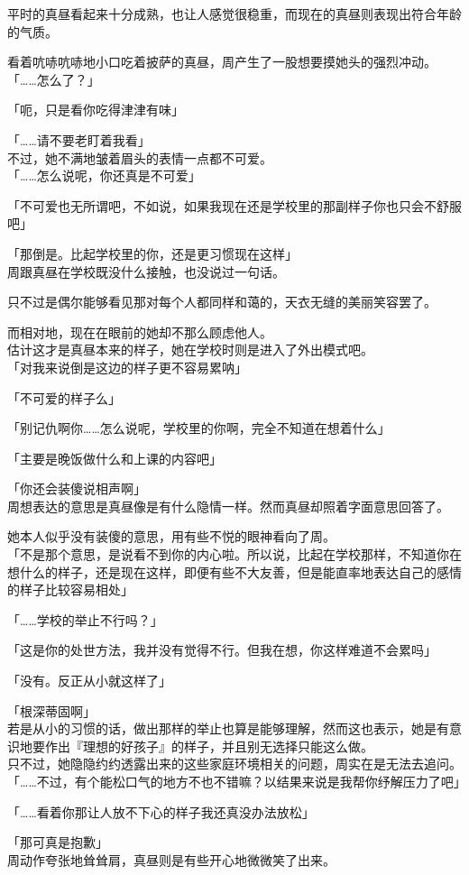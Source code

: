 平时的真昼看起来十分成熟，也让人感觉很稳重，而现在的真昼则表现出符合年龄的气质。

看着吭哧吭哧地小口吃着披萨的真昼，周产生了一股想要摸她头的强烈冲动。\\

「……怎么了？」

「呃，只是看你吃得津津有味」

「……请不要老盯着我看」\\

不过，她不满地皱着眉头的表情一点都不可爱。\\

「……怎么说呢，你还真是不可爱」

「不可爱也无所谓吧，不如说，如果我现在还是学校里的那副样子你也只会不舒服吧」

「那倒是。比起学校里的你，还是更习惯现在这样」\\

周跟真昼在学校既没什么接触，也没说过一句话。

只不过是偶尔能够看见那对每个人都同样和蔼的，天衣无缝的美丽笑容罢了。

而相对地，现在在眼前的她却不那么顾虑他人。\\

估计这才是真昼本来的样子，她在学校时则是进入了外出模式吧。\\

「对我来说倒是这边的样子更不容易累呐」

「不可爱的样子么」

「别记仇啊你……怎么说呢，学校里的你啊，完全不知道在想着什么」

「主要是晚饭做什么和上课的内容吧」

「你还会装傻说相声啊」\\

周想表达的意思是真昼像是有什么隐情一样。然而真昼却照着字面意思回答了。

她本人似乎没有装傻的意思，用有些不悦的眼神看向了周。\\

「不是那个意思，是说看不到你的内心啦。所以说，比起在学校那样，不知道你在想什么的样子，还是现在这样，即便有些不大友善，但是能直率地表达自己的感情的样子比较容易相处」

「……学校的举止不行吗？」

「这是你的处世方法，我并没有觉得不行。但我在想，你这样难道不会累吗」

「没有。反正从小就这样了」

「根深蒂固啊」\\

若是从小的习惯的话，做出那样的举止也算是能够理解，然而这也表示，她是有意识地要作出『理想的好孩子』的样子，并且别无选择只能这么做。\\

只不过，她隐隐约约透露出来的这些家庭环境相关的问题，周实在是无法去追问。\\

「……不过，有个能松口气的地方不也不错嘛？以结果来说是我帮你纾解压力了吧」

「……看着你那让人放不下心的样子我还真没办法放松」

「那可真是抱歉」\\

周动作夸张地耸耸肩，真昼则是有些开心地微微笑了出来。

